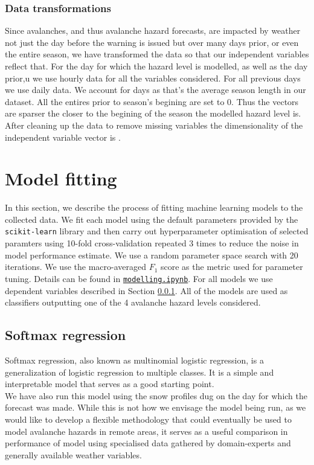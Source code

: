 \documentclass{article}
\begin{document}
\subsubsection{Data transformations}\label{sec:weather_data_trans}
	Since avalanches, and thus avalanche hazard forecasts, are impacted by weather not just the day before the warning is issued but over many days prior, or even the entire season, we have transformed the data so that our independent variables reflect that. For the day for which the hazard level is modelled, as well as the day prior,u we use hourly data for all the variables considered. For all previous days we use daily data. We account for days as that's the average season length in our dataset. All the entires prior to season's begining are set to 0. Thus the vectors are sparser the closer to the begining of the season the modelled hazard level is. After cleaning up the data to remove missing variables the dimensionality of the independent variable vector is \unskip.

\section{Model fitting}

	In this section, we describe the process of fitting machine learning models to the collected data. We fit each model using the default parameters provided by the \texttt{scikit-learn} library and then carry out hyperparameter optimisation of selected paramters using 10-fold cross-validation repeated 3 times to reduce the noise in model performance estimate. We use a random parameter space search with 20 iterations. We use the macro-averaged $F_1$ score as the metric used for parameter tuning. Details can be found in \href{https://github.com/witgaw/avalanche-danger-level-forecast/blob/main/src/modelling.ipynb}{\texttt{modelling.ipynb}}.
	For all models we use dependent variables described in Section \ref{sec:weather_data_trans}.
	All of the models are used as classifiers outputting one of the 4 avalanche hazard levels considered.

\subsection{Softmax regression}

	Softmax regression, also known as multinomial logistic regression, is a generalization of logistic regression to multiple classes. It is a simple and interpretable model that serves as a good starting point. \\
	We have also run this model using the snow profiles dug on the day for which the forecast was made. While this is not how we envisage the model being run, as we would like to develop a flexible methodology that could eventually be used to model avalanche hazards in remote areas, it serves as a useful comparison in performance of model using specialised data gathered by domain-experts and generally available weather variables.
\end{document}
